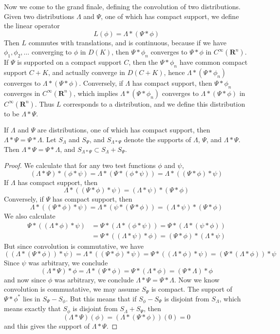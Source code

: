 Now we come to the grand finale, defining the convolution of two distributions. Given two distributions $\Lambda$ and $\Psi$, one of which has compact support, we define the linear operator
%
\[ L(\phi) = \Lambda * (\Psi * \phi) \]
%
Then $L$ commutes with translations, and is continuous, because if we have $\phi_1, \phi_2, \dots$ converging to $\phi$ in $D(K)$, then $\Psi * \phi_n$ converges to $\Psi * \phi$ in $C^\infty(\mathbf{R}^n)$. If $\Psi$ is supported on a compact support $C$, then the $\Psi * \phi_n$ have common compact support $C + K$, and actually converge in $D(C + K)$, hence $\Lambda * (\Psi * \phi_n)$ converges to $\Lambda * (\Psi * \phi)$. Conversely, if $\Lambda$ has compact support, then $\Psi * \phi_n$ converges in $C^\infty(\mathbf{R}^n)$, which implies $\Lambda * (\Psi * \phi_n)$ converges to $\Lambda * (\Psi * \phi)$ in $C^\infty(\mathbf{R}^n)$. Thus $L$ corresponds to a distribution, and we define this distribution to be $\Lambda * \Psi$.

\begin{theorem}
    If $\Lambda$ and $\Psi$ are distributions, one of which has compact support, then $\Lambda * \Psi = \Psi * \Lambda$. Let $S_\Lambda$ and $S_\Psi$, and $S_{\Lambda * \Psi}$ denote the supports of $\Lambda$, $\Psi$, and $\Lambda * \Psi$. Then $\Lambda * \Psi = \Psi * \Lambda$, and $S_{\Lambda * \Psi} \subset S_\Lambda + S_\Psi$.
\end{theorem}
\begin{proof}
    We calculate that for any two test functions $\phi$ and $\psi$,
    \[ (\Lambda * \Psi) * (\phi * \psi) = \Lambda * (\Psi * (\phi * \psi)) = \Lambda * ((\Psi * \phi) * \psi) \]
    If $\Lambda$ has compact support, then
    \[ \Lambda * ((\Psi * \phi) * \psi) = (\Lambda * \psi) * (\Psi * \phi) \]
    Conversely, if $\Psi$ has compact support, then
    \[ \Lambda * ((\Psi * \phi) * \psi) = \Lambda * (\psi * (\Psi * \phi)) = (\Lambda * \psi) * (\Psi * \phi) \]
    We also calculate
    \begin{align*}
        \Psi * ((\Lambda * \phi) * \psi) &= \Psi * (\Lambda * (\phi * \psi)) = \Psi * (\Lambda * (\psi * \phi))\\
        &= \Psi * ((\Lambda * \psi) * \phi) = (\Psi * \phi) * (\Lambda * \psi)
    \end{align*}
    But since convolution is commutative, we have
    \[ ((\Lambda * (\Psi * \phi)) * \psi) = \Lambda * ((\Psi * \phi) * \psi) = \Psi * ((\Lambda * \phi) * \psi) = (\Psi * (\Lambda * \phi)) * \psi \]
    Since $\psi$ was arbitrary, we conclude
    \[ (\Lambda * \Psi) * \phi = \Lambda * (\Psi * \phi) = \Psi * (\Lambda * \phi) = (\Psi * \Lambda) * \phi \]
    and now since $\phi$ was arbitrary, we conclude $\Lambda * \Psi = \Psi * \Lambda$. Now we know convolution is commuatative, we may assume $S_\Psi$ is compact. The support of $\Psi * \phi^*$ lies in $S_\Psi - S_\phi$. But this means that if $S_\phi - S_\Psi$ is disjoint from $S_\Lambda$, which means exactly that $S_\phi$ is disjoint from $S_\Lambda + S_\Psi$, then
    \[ (\Lambda * \Psi)(\phi) = (\Lambda * (\Psi * \phi))(0) = 0 \]
    and this gives the support of $\Lambda * \Psi$.
\end{proof}

